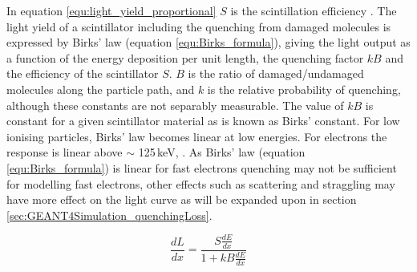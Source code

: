 In equation \ref{equ:light_yield_proportional} $S$ is the scintillation efficiency \cite{birks_1964}. The light yield of a scintillator including the quenching from damaged molecules is expressed by Birks' law (equation \ref{equ:Birks_formula}), giving the light output as a function of the energy deposition per unit length, the quenching factor $kB$ and the efficiency of the scintillator $S$. $B$ is the ratio of damaged/undamaged molecules along the particle path, and $k$ is the relative probability of quenching, although these constants are not separably measurable. The value of $kB$ is constant for a given scintillator material as is known as Birks' constant. For low ionising particles, Birks' law becomes linear at low energies. For electrons the response is linear above $\sim$ 125\,keV, \cite{craun_1970}. As Birks' law (equation \ref{equ:Birks_formula}) is linear for fast electrons \cite{knoll_2010} quenching may not be sufficient for modelling fast electrons, other effects such as scattering and straggling may have more effect on the light curve as will be expanded upon in section \ref{sec:GEANT4Simulation_quenchingLoss}. 

\begin{equation}
\frac{dL}{dx} = \frac{S\frac{dE}{dx}}{1 + kB \frac{dE}{dx}}
\label{equ:Birks_formula}
\end{equation}

